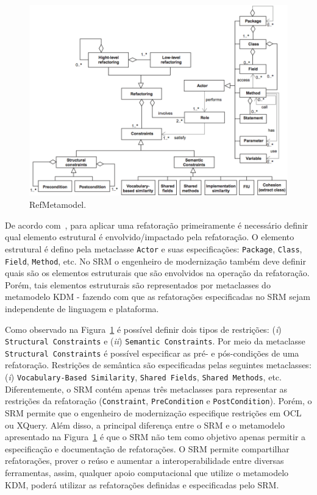\begin{figure}[h]
	\centering
	\caption{RefMetamodel.}
	\label{fig:refactoring_metamodel_related}
	\includegraphics[scale=0.45]{images/metamodelo_refatoracao_related}
\end{figure}

De acordo com~, para aplicar uma refatoração primeiramente é necessário definir qual elemento estrutural é envolvido/impactado pela refatoração. O elemento estrutural é defino pela metaclasse \texttt{Actor} e suas especificações: \texttt{Package}, \texttt{Class}, \texttt{Field}, \texttt{Method}, etc. No SRM o engenheiro de modernização também deve definir quais são os elementos estruturais que são envolvidos na operação da refatoração. Porém, tais elementos estruturais são representados por metaclasses do metamodelo KDM - fazendo com que as refatorações especificadas no SRM sejam independente de linguagem e plataforma. 

Como observado na Figura~\ref{fig:refactoring_metamodel_related} é possível definir dois tipos de restrições: (\textit{i}) \texttt{Structural Constraints} e (\textit{ii}) \texttt{Semantic Constraints}. Por meio da metaclasse \texttt{Structural Constraints} é possível especificar as pré- e pós-condições de uma refatoração. Restrições de semântica são especificadas pelas seguintes metaclasses: (\textit{i}) \texttt{Vocabulary-Based Similarity}, \texttt{Shared Fields}, \texttt{Shared Methods}, etc. Diferentemente, o SRM contém apenas três metaclasses para representar as restrições da refatoração (\texttt{Constraint}, \texttt{PreCondition} e \texttt{PostCondition}). Porém, o SRM permite que o engenheiro de modernização especifique restrições em OCL ou XQuery. Além disso, a principal diferença entre o SRM e o metamodelo apresentado na Figura~\ref{fig:refactoring_metamodel_related} é que o SRM não tem como objetivo apenas permitir a especificação e documentação de refatorações. O SRM permite compartilhar refatorações, prover o reúso e aumentar a interoperabilidade entre diversas ferramentas, assim, qualquer apoio computacional que utilize o metamodelo KDM, poderá utilizar as refatorações definidas e especificadas pelo SRM.

